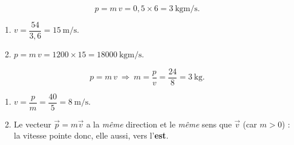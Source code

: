 \documentclass[11pt,a4paper]{article}
\newcommand{\vv}[1]{\vec{#1}}\newcommand{\ds}{\displaystyle}
\begin{document}

\begin{corrige}
\[
p=m\,v=0,5\times6=\qty{3}{\kilogram\metre\per\second}.
\]
\end{corrige}

\begin{corrige}
\begin{enumerate}[label=\alph*)]
  \item $v=\dfrac{54}{3,6}=\qty{15}{\metre\per\second}$.
  \item $p=m\,v=1200\times15=\qty{18000}{\kilogram\metre\per\second}$.
\end{enumerate}
\end{corrige}

\begin{corrige}
\[
p=m\,v\ \Rightarrow\ m=\frac{p}{v}=\frac{24}{8}=\qty{3}{\kilogram}.
\]
\end{corrige}

\begin{corrige}
\begin{enumerate}[label=\alph*)]
  \item $v=\dfrac{p}{m}=\dfrac{40}{5}=\qty{8}{\metre\per\second}$.
  \item Le vecteur $\vv p=m\vv v$ a la \emph{même} direction et le \emph{même} sens que $\vv v$
        (car $m>0$) : la vitesse pointe donc, elle aussi, vers l'\textbf{est}.
\end{enumerate}
\end{corrige}
\end{document}
